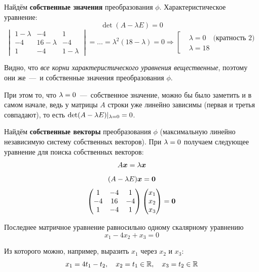\documentclass[a4paper,12pt]{article}
\theoremstyle{remark}
\begin{document}
  \begin{solution}
  
  Найдём \textbf{собственные значения} преобразования $\phi$.
  Характеристическое уравнение:
  \[
    \det (A - \lambda E) = 0
  \]
  \[
    \begin{vmatrix}
      1 - \lambda & -4 & 1\\
      -4 & 16 - \lambda & -4\\
      1 & -4 & 1 - \lambda
    \end{vmatrix} = \ldots = \lambda^2 (18 - \lambda) = 0
    \Rightarrow \left[
      \begin{aligned}
        &\lambda = 0\quad \mbox{(кратность $2$)}\\
        &\lambda = 18
      \end{aligned}
    \right.
  \]
  
  Видно, что \emph{все корни характеристического уравнения вещественные}, поэтому они же~---~и собственные значения преобразования $\phi$.
  
  При этом то, что $\lambda \hm= 0$~---~собственное значение, можно бы было заметить и в самом начале, ведь у матрицы $A$ строки уже линейно зависимы (первая и третья совпадают), то есть $\det(A \hm- \lambda E)|_{\lambda = 0} \hm= 0$.
  
  \medskip
  
  Найдём \textbf{собственные векторы} преобразования $\phi$ (максимальную линейно независимую систему собственных векторов).
  При $\lambda \hm= 0$ получаем следующее уравнение для поиска собственных векторов:
  \[
    A \boldsymbol x = \lambda \boldsymbol x
  \]
  \[
    (A - \lambda E) \boldsymbol x = \boldsymbol 0
  \]
  \[
    \begin{pmatrix}
      1 & -4 & 1\\
      -4 & 16 & -4\\
      1 & -4 & 1
    \end{pmatrix} \begin{pmatrix}
      x_1 \\ x_2 \\ x_3
    \end{pmatrix} = \boldsymbol 0
  \]
  
  Последнее матричное уравнение равносильно одному скалярному уравнению
  \[
    x_1 - 4 x_2 + x_3 = 0
  \]
  
  Из которого можно, например, выразить $x_1$ через $x_2$ и $x_3$:
  \[
    x_1 = 4 t_1 - t_2,\quad x_2 = t_1 \in \operatorname{\mathbb R},\quad x_3 = t_2 \in \operatorname{\mathbb R}
  \]
  

\end{solution}
\end{document}
